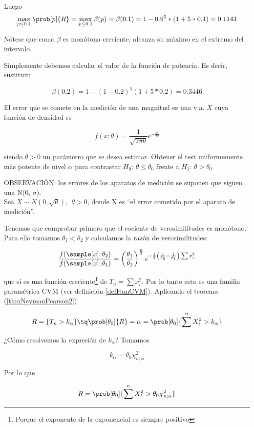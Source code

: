 \begin{problem}[2]
Luego
\begin{gather*}
\max_{p \leq 0.1} \prob[p]{R} = \max_{p \leq 0.1} \beta(p) = \beta(0.1) = 1 - 0.9^5 * (1 + 5*0.1) = 0.1143
\end{gather*}

Nótese que como $\beta$ es monótona creciente, alcanza su máximo en el extremo del intervalo.

\spart
Simplemente debemos calcular el valor de la función de potencia. Es decir, sustituir:

\[
\beta(0.2) = 1 - (1 - 0.2)^5 (1 + 5*0.2) = 0.3446
\]

\end{problem}


\begin{problem}[3]
El error que se comete en la medición de una magnitud es una v.a. $X$ cuya función de densidad es 

\[ f(x;\theta) = \frac{1}{\sqrt{2\pi\theta}}e^{-\frac{x^2}{2\theta}} \]

siendo $\theta > 0$ un parámetro que se desea estimar. Obtener el test uniformemente más potente de nivel $\alpha$ para contrastar $H_0:\,\theta\leq\theta_0$ frente a $H_1:\,\theta > \theta_0$

\solution
OBSERVACIÓN: los errores de los aparatos de medición se suponen que siguen una N(0, $\sigma$).\\

Sea $X \sim N(0, \sqrt{\theta})$, $\; \theta > 0$, donde X es ``el error cometido por el aparato de medición''. 

Tenemos que comprobar primero que el cociente de verosimilitudes es monótono. Para ello tomamos $\theta_1 < \theta_2$ y calculamos la razón de verosimilitudes:

\[
\frac{f(\sample[x];\theta_2)}{f(\sample[x];\theta_1)} =
\left(\frac{\theta_1}{\theta_2}\right)^{\frac{n}{2}} e^{-\frac{1}{2}\left(\frac{1}{\theta_2} - \frac{1}{\theta_1}\right)\sum x_i^2}
\]

que sí es una función creciente\footnote{Porque el exponente de la exponencial es siempre positivo} de $T_n=\sum x_i^2$. Por lo tanto esta es una familia paramétrica CVM (ver definición \ref{defFamCVM}). Aplicando el teorema (\ref{thmNeymanPearson2})

\[ R = \{ T_n > k_\alpha \} \tq \prob[\theta_0]{R} = \alpha = \prob[\theta_0]{\sum\limits^n X_i^2 > k_\alpha} \] 

¿Cómo resolvemos la expresión de $k_\alpha$? Tomamos

\[ k_\alpha = \theta_0 \chi_{n;\alpha}^2 \]

Por lo que

\[ R = \prob[\theta_0]{\sum\limits^n X_i^2 > \theta_0 \chi_{n;\alpha}^2} \]

\end{problem}

